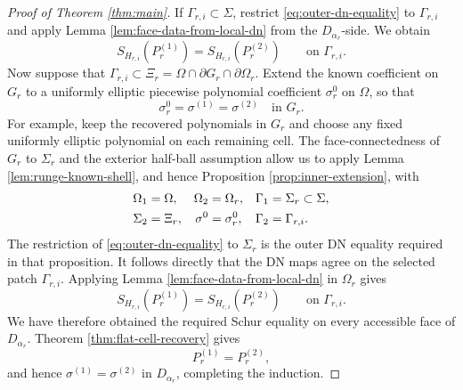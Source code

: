 \documentclass[10pt,a4paper]{amsart}
\begin{document}
\begin{proof}[Proof of Theorem \ref{thm:main}]
If \(\Gamma_{r,i}\subset\Sigma\), restrict
\eqref{eq:outer-dn-equality} to \(\Gamma_{r,i}\) and apply Lemma
\ref{lem:face-data-from-local-dn} from the \(D_{\alpha_r}\)-side.  We obtain
\begin{equation}
  S_{H_{r,i}}(P_r^{(1)})
  =
  S_{H_{r,i}}(P_r^{(2)})
  \qquad\text{on }\Gamma_{r,i}.
  \label{eq:exterior-face-data}
\end{equation}
Now suppose that
\(\Gamma_{r,i}\subset\Xi_r=\Omega\cap\partial G_r\cap\partial\Omega_r\).
Extend the known coefficient on \(G_r\) to a uniformly elliptic piecewise
polynomial coefficient \(\sigma^0_r\) on \(\Omega\), so that
\begin{equation}
  \sigma^0_r=\sigma^{(1)}=\sigma^{(2)}
  \quad\text{in }G_r .
\end{equation}
For example, keep the recovered polynomials in \(G_r\) and choose any fixed
uniformly elliptic polynomial on each remaining cell.  The face-connectedness
of \(G_r\) to \(\Sigma_r\) and the exterior half-ball assumption allow us to
apply Lemma \ref{lem:runge-known-shell}, and hence Proposition
\ref{prop:inner-extension}, with
\begin{align}
  \Omega_1&=\Omega,&
  \Omega_2&=\Omega_r,&
  \Gamma_1&=\Sigma_r\subset\Sigma,\notag\\
  \Sigma_2&=\Xi_r,&
  \sigma^0&=\sigma^0_r,&
  \Gamma_2&=\Gamma_{r,i} .
\end{align}
The restriction of \eqref{eq:outer-dn-equality} to \(\Sigma_r\) is the outer
DN equality required in that proposition.  It follows directly that the DN
maps agree on the selected patch \(\Gamma_{r,i}\).  Applying Lemma
\ref{lem:face-data-from-local-dn} in \(\Omega_r\) gives
\begin{equation}
  S_{H_{r,i}}(P_r^{(1)})
  =
  S_{H_{r,i}}(P_r^{(2)})
  \qquad\text{on }\Gamma_{r,i}.
  \label{eq:interior-face-data}
\end{equation}
We have therefore obtained the required Schur equality on every accessible
face of \(D_{\alpha_r}\).  Theorem \ref{thm:flat-cell-recovery} gives
\begin{equation}
  P_r^{(1)}=P_r^{(2)},
\end{equation}
and hence \(\sigma^{(1)}=\sigma^{(2)}\) in \(D_{\alpha_r}\), completing the
induction.
\end{proof}
\end{document}
